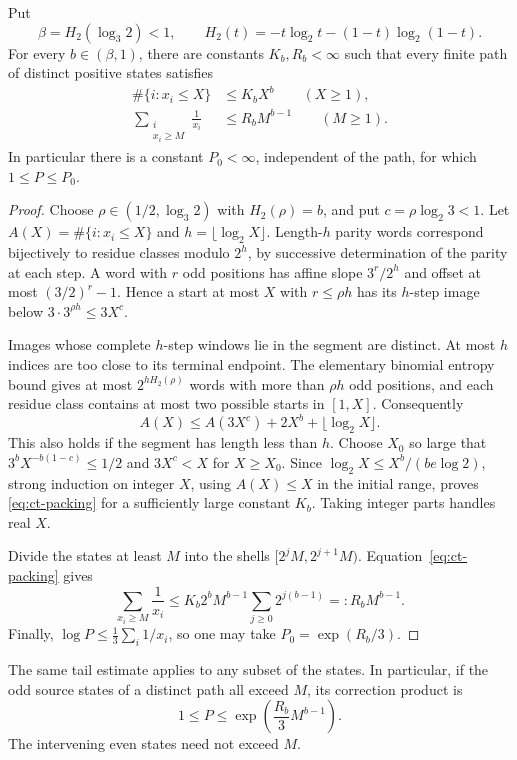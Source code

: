 \begin{lemma}\label{lem:ct-packing}
Put
\[
 \beta=H_2(\log_3 2)<1,\qquad
 H_2(t)=-t\log_2t-(1-t)\log_2(1-t).
\]
For every \(b\in(\beta,1)\), there are constants \(K_b,R_b<\infty\)
such that every finite path of distinct positive states satisfies
\begin{align}
 \#\{i:x_i\le X\}&\le K_bX^b\qquad(X\ge1),\label{eq:ct-packing}\\
 \sum_{\substack{i\\x_i\ge M}}\frac1{x_i}
     &\le R_bM^{b-1}\qquad(M\ge1).\label{eq:ct-packing-tail}
\end{align}
In particular there is a constant \(P_0<\infty\), independent of
the path, for which \(1\le P\le P_0\).
\end{lemma}
\begin{proof}
Choose \(\rho\in(1/2,\log_3 2)\) with \(H_2(\rho)=b\), and put
\(c=\rho\log_2 3<1\). Let
\(A(X)=\#\{i:x_i\le X\}\) and \(h=\lfloor\log_2X\rfloor\).
Length-\(h\) parity words correspond bijectively to residue classes
modulo \(2^h\), by successive determination of the parity at each
step. A word with \(r\) odd positions has affine slope
\(3^r/2^h\) and offset at most \((3/2)^r-1\). Hence a start at
most \(X\) with \(r\le\rho h\) has its \(h\)-step image below
\(3\cdot3^{\rho h}\le3X^c\).

Images whose complete \(h\)-step windows lie in the segment are
distinct. At most \(h\) indices are too close to its terminal
endpoint. The elementary binomial entropy bound gives at most
\(2^{hH_2(\rho)}\) words with more than \(\rho h\) odd positions,
and each residue class contains at most two possible starts in
\([1,X]\). Consequently
\[
 A(X)\le A(3X^c)+2X^b+\lfloor\log_2X\rfloor.
\]
This also holds if the segment has length less than \(h\).
Choose \(X_0\) so large that
\(3^bX^{-b(1-c)}\le1/2\) and \(3X^c<X\) for \(X\ge X_0\).
Since
\(\log_2X\le X^b/(be\log2)\), strong induction on integer \(X\),
using \(A(X)\le X\) in the initial range, proves
\eqref{eq:ct-packing} for a sufficiently large constant \(K_b\).
Taking integer parts handles real \(X\).

Divide the states at least \(M\) into the shells
\([2^jM,2^{j+1}M)\). Equation~\eqref{eq:ct-packing} gives
\[
 \sum_{x_i\ge M}\frac1{x_i}
 \le K_b2^bM^{b-1}\sum_{j\ge0}2^{j(b-1)}
 =:R_bM^{b-1}.
\]
Finally, \(\log P\le\frac13\sum_i1/x_i\), so one may take
\(P_0=\exp(R_b/3)\).
\end{proof}

The same tail estimate applies to any subset of the states.
In particular, if the odd source states of a distinct path all
exceed \(M\), its correction product is
\begin{equation}\label{eq:ct-prefix-product}
 1\le P\le\exp\!\left(\frac{R_b}{3}M^{b-1}\right).
\end{equation}
The intervening even states need not exceed \(M\).

